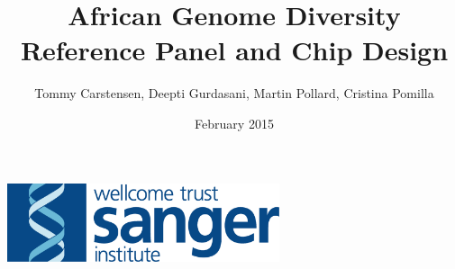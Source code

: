 \documentclass{article}
\title{African Genome Diversity Reference Panel and Chip Design}
\author{Tommy Carstensen, Deepti Gurdasani, Martin Pollard, Cristina Pomilla}
\date{February 2015}
\begin{document}
\maketitle
\centerline{\includegraphics[width=80mm]{sang_logo_large}}











\end{document}
